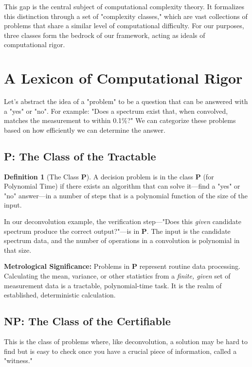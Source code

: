 \documentclass[12pt]{article}
\theoremstyle{definition}
\newtheorem{definition}{Definition}[section]
\begin{document}
This gap is the central subject of computational complexity theory. It formalizes this distinction through a set of "complexity classes," which are vast collections of problems that share a similar level of computational difficulty. For our purposes, three classes form the bedrock of our framework, acting as ideals of computational rigor.

\section{A Lexicon of Computational Rigor}

Let's abstract the idea of a "problem" to be a question that can be answered with a "yes" or "no". For example: "Does a spectrum exist that, when convolved, matches the measurement to within 0.1\%?" We can categorize these problems based on how efficiently we can determine the answer.

\subsection{P: The Class of the Tractable}

\begin{definition}[The Class $\mathbf{P}$]
A decision problem is in the class $\mathbf{P}$ (for Polynomial Time) if there exists an algorithm that can solve it—find a "yes" or "no" answer—in a number of steps that is a polynomial function of the size of the input.
\end{definition}

In our deconvolution example, the verification step—"Does this \emph{given} candidate spectrum produce the correct output?"—is in $\mathbf{P}$. The input is the candidate spectrum data, and the number of operations in a convolution is polynomial in that size.

\textbf{Metrological Significance:} Problems in $\mathbf{P}$ represent routine data processing. Calculating the mean, variance, or other statistics from a \emph{finite, given} set of measurement data is a tractable, polynomial-time task. It is the realm of established, deterministic calculation.

\subsection{NP: The Class of the Certifiable}

This is the class of problems where, like deconvolution, a solution may be hard to find but is easy to check once you have a crucial piece of information, called a "witness."
\end{document}
